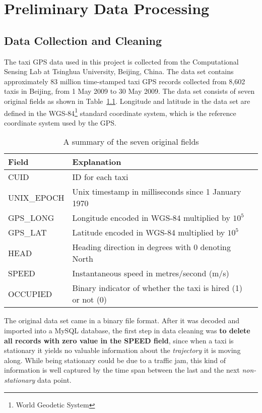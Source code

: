 \chapter{Preliminary Data Processing}\label{Chap:2}
\section{Data Collection and Cleaning}
The taxi GPS data used in this project is collected from the Computational Sensing Lab \cite{BPLL13} at Tsinghua University, Beijing, China. The data set contains approximately 83 million time-stamped taxi GPS records collected from 8,602 taxis in Beijing, from 1 May 2009 to 30 May 2009. The data set consists of seven original fields as shown in Table~\ref{Ta:orig_field}. Longitude and latitude in the data set are defined in the WGS-84\footnote{World Geodetic System} standard coordinate system, which is the reference coordinate system used by the GPS.

\begin{table}[h!]
\centering
\begin{tabular}{ | l | l | l | }
\hline
\textbf{Field} & \textbf{Explanation} \\ \hline
CUID & ID for each taxi \\ \hline
UNIX\_EPOCH & Unix timestamp in milliseconds since 1 January 1970\\ \hline
GPS\_LONG & Longitude encoded in WGS-84 multiplied by $10^{5}$\\ \hline
GPS\_LAT & Latitude encoded in WGS-84 multiplied by $10^{5}$ \\ \hline
HEAD & Heading direction in degrees with 0 denoting North\\ \hline
SPEED & Instantaneous speed in metres/second (m/s)\\ \hline
OCCUPIED & Binary indicator of whether the taxi is hired (1) or not (0)\\ \hline
\end{tabular}
\caption{A summary of the seven original fields}\label{Ta:orig_field}
\end{table}

The original data set came in a binary file format. After it was decoded and imported into a MySQL database, the first step in data cleaning was \textbf{to delete all records with zero value in the SPEED field}, since when a taxi is stationary it yields no valuable information about the \emph{trajectory} it is moving along. While being stationary could be due to a traffic jam, this kind of information is well captured by the time span between the last and the next \emph{non-stationary} data point. 

